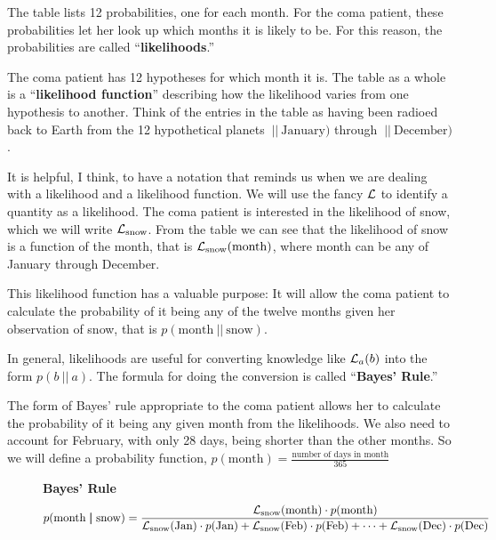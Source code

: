 \documentclass[
  letterpaper,
  DIV=11,
  numbers=noendperiod,
  oneside]{scrreprt}
\begin{document}
The table lists 12 probabilities, one for each month. For the coma
patient, these probabilities let her look up which months it is likely
to be. For this reason, the probabilities are called
``\textbf{likelihoods}.''

The coma patient has 12 hypotheses for which month it is. The table as a
whole is a ``\textbf{likelihood function}'' describing how the
likelihood varies from one hypothesis to another. Think of the entries
in the table as having been radioed back to Earth from the 12
hypothetical planets \({\ |\!\!|\  } \text{January})\) through
\({\ |\!\!|\  } \text{December})\).

It is helpful, I think, to have a notation that reminds us when we are
dealing with a likelihood and a likelihood function. We will use the
fancy \({\cal L}\) to identify a quantity as a likelihood. The coma
patient is interested in the likelihood of snow, which we will write
\({\cal L}_\text{snow}\). From the table we can see that the likelihood
of snow is a function of the month, that is
\({\cal L}_\text{snow}(\text{month})\), where month can be any of
January through December.

This likelihood function has a valuable purpose: It will allow the coma
patient to calculate the probability of it being any of the twelve
months given her observation of snow, that is
\(p(\text{month} {\ |\!\!|\  } \text{snow})\).

In general, likelihoods are useful for converting knowledge like
\({\cal L}_a(b)\) into the form \(p(b {\ |\!\!|\  } a)\). The formula
for doing the conversion is called ``\textbf{Bayes' Rule}.''

The form of Bayes' rule appropriate to the coma patient allows her to
calculate the probability of it being any given month from the
likelihoods. We also need to account for February, with only 28 days,
being shorter than the other months. So we will define a probability
function,
\(p(\text{month}) = \frac{\text{number of days in month}}{365}\)

\begin{figure}

\textbf{Bayes' Rule}
\[p(\text{month} {\ |\!\!|\  } \text{snow}) = \frac{{\cal L}_\text{snow}(\text{month}) \cdot p(\text{month})}{{\cal L}_\text{snow}(\text{Jan}) \cdot p(\text{Jan}) + 
  {\cal L}_\text{snow}(\text{Feb}) \cdot p(\text{Feb}) + \cdots + 
  {\cal L}_\text{snow}(\text{Dec}) \cdot p(\text{Dec})}\]

\end{figure}
\end{document}
